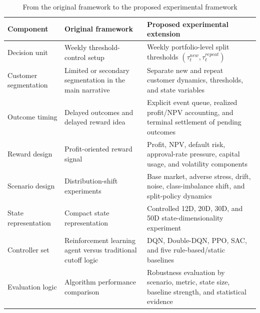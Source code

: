 \documentclass[12pt,a4paper]{article}
\begin{document}
\begin{table}[H]
    \centering
    \small
    \begin{tabular}{p{}p{}p{}}
        \toprule
        Component             & Original framework                                           & Proposed experimental extension                                                                    \\
        \midrule
        Decision unit         & Weekly threshold-control setup                               & Weekly portfolio-level split thresholds $(\tau^{new}_t,\tau^{repeat}_t)$                           \\
        Customer segmentation & Limited or secondary segmentation in the main narrative      & Separate new and repeat customer dynamics, thresholds, and state variables                         \\
        Outcome timing        & Delayed outcomes and delayed reward idea                     & Explicit event queue, realized profit/NPV accounting, and terminal settlement of pending outcomes  \\
        Reward design         & Profit-oriented reward signal                                & Profit, NPV, default risk, approval-rate pressure, capital usage, and volatility components        \\
        Scenario design       & Distribution-shift experiments                               & Base market, adverse stress, drift, noise, class-imbalance shift, and split-policy dynamics        \\
        State representation  & Compact state representation                                 & Controlled 12D, 20D, 30D, and 50D state-dimensionality experiment                                  \\
        Controller set        & Reinforcement learning agent versus traditional cutoff logic & DQN, Double-DQN, PPO, SAC, and five rule-based/static baselines                                    \\
        Evaluation logic      & Algorithm performance comparison                             & Robustness evaluation by scenario, metric, state size, baseline strength, and statistical evidence \\
        \bottomrule
    \end{tabular}
    \caption{From the original framework to the proposed experimental framework}
    \label{tab:framework_extension}
\end{table}
\end{document}
